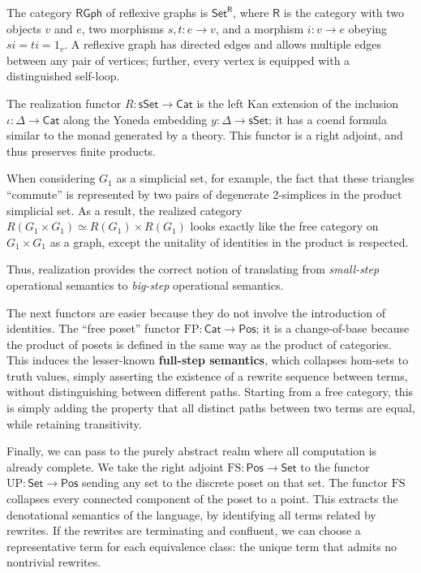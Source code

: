 \documentclass{amsart}
\theoremstyle{definition}
\newcommand{\sSet}{\mathsf{sSet}}
\newcommand{\RGph}{\mathsf{RGph}}
\newcommand{\Set}{\mathsf{Set}}
\newcommand{\Cat}{\mathsf{Cat}}
\newcommand{\Pos}{\mathsf{Pos}}
\newcommand{\R}{\mathsf{R}}
\newcommand{\FC}{\mathrm{FC}}
\newcommand{\FP}{\mathrm{FP}}
\newcommand{\FS}{\mathrm{FS}}
\newcommand{\UP}{\mathrm{UP}}
\newcommand{\maps}{\colon}
\begin{document}
The category $\RGph$ of reflexive graphs is $\Set^\R$, where $\R$ is the category with two objects $v$ and $e$, two morphisms $s,t \maps e \to v$, and a morphism $i \maps v \to e$ obeying $si = ti = 1_v$.   A reflexive graph has directed edges and allows multiple edges between any pair of vertices; further, every vertex is equipped with a distinguished self-loop.  

The realization functor $R\maps \sSet\to \Cat$ is the left Kan extension of the inclusion $\iota\maps \Delta \to \Cat$ along the Yoneda embedding $y\maps \Delta\to \sSet$; it has a coend formula similar to the monad generated by a theory. This functor is a right adjoint, and thus preserves finite products.

When considering $G_1$ as a simplicial set, for example, the fact that these triangles ``commute'' is represented by two pairs of degenerate 2-simplices in the product simplicial set. As a result, the realized category $R(G_1\times G_1) \simeq R(G_1)\times R(G_1)$ looks exactly like the free category on $G_1\times G_1$ as a graph, except the unitality of identities in the product is respected.

Thus, realization provides the correct notion of translating from \emph{small-step} operational semantics to \emph{big-step} operational semantics.



The next functors are easier because they do not involve the introduction of identities. The ``free poset'' functor $\FP\maps \Cat \to \Pos$; it is a change-of-base because the product of posets is defined in the same way as the product of categories. This induces the lesser-known \textbf{full-step semantics}, which collapses hom-sets to truth values, simply asserting the existence of a rewrite sequence between terms, without distinguishing between different paths. Starting from a free category, this is simply adding the property that all distinct paths between two terms are equal, while retaining transitivity.

Finally, we can pass to the purely abstract realm where all computation is already complete. We take the right adjoint $\FS\maps \Pos \to \Set$ to the functor $\UP \maps \Set \to \Pos$ sending any set to the discrete poset on that set.
The functor $\FS$ collapses every connected component of the poset to a point.   This extracts
the denotational semantics of the language, by identifying all terms related by rewrites.  If the rewrites are terminating and confluent, we can choose a representative term for each equivalence class: the unique term that admits no nontrivial rewrites.
\end{document}
